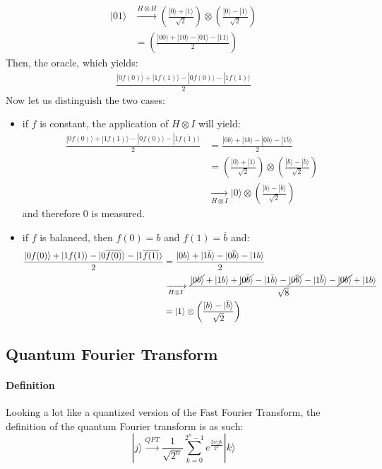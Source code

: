 \documentclass{article}
\begin{document}
\begin{align*}
    |01\rangle &\xrightarrow{H\otimes H} \left(\frac{|0\rangle+|1\rangle}{\sqrt{2}}\right)\otimes \left(\frac{|0\rangle-|1\rangle}{\sqrt{2}}\right)\\
    &= \left(\frac{|00\rangle+|10\rangle-|01\rangle-|11\rangle}{2}\right)
\end{align*}
Then, the oracle, which yields:
\begin{align*}
\frac{|0f(0)\rangle+|1f(1)\rangle-|0\overline{f(0)}\rangle-|1\overline{f(1)}\rangle}{2}
\end{align*}
Now let us distinguish the two cases:
\begin{itemize}
    \item if $f$ is constant, the application of $H\otimes I$ will yield:
\begin{align*}
\frac{|0f(0)\rangle+|1f(1)\rangle-|0\overline{f(0)}\rangle-|1\overline{f(1)}\rangle}{2}
&=\frac{|0b\rangle+|1b\rangle-|0\overline{b}\rangle-|1\overline{b}\rangle}{2}\\
&=\left(\frac{|0\rangle+|1\rangle}{\sqrt{2}}\right)\otimes \left(\frac{|b\rangle-|\overline{b}\rangle}{\sqrt{2}}\right)\\
&\xrightarrow[H\otimes I]{} |0\rangle \otimes \left(\frac{|b\rangle-|\overline{b}\rangle}{\sqrt{2}}\right)
\end{align*}
and therefore $0$ is measured.
\item if $f$ is balanced, then $f(0)=b$ and $f(1)=\overline{b}$ and:
\begin{align*}
\frac{|0f(0)\rangle+|1f(1)\rangle-|0\overline{f(0)}\rangle-|1\overline{f(1)}\rangle}{2}
&=\frac{|0b\rangle+|1\bar{b}\rangle-|0\overline{b}\rangle-|1b\rangle}{2}\\
&\xrightarrow[H\otimes I]{}
    \frac{\cancel{|0b\rangle}+|1b\rangle+\cancel{|0\bar{b}\rangle}-|1\bar{b}\rangle-\cancel{|0\overline{b}\rangle}-|1\overline{b}\rangle-\cancel{|0b\rangle}+|1b\rangle}{\sqrt{8}}\\
&= |1\rangle\otimes\left(\frac{|b\rangle-|\overline{b}\rangle}{\sqrt{2}}\right)
\end{align*}
\end{itemize}
\subsection{Quantum Fourier Transform}

\paragraph{Definition} Looking a lot like a quantized version of the Fast Fourier Transform, the definition of the quantum Fourier
transform is as such:
$$ |j\rangle \xrightarrow[]{QFT} \frac{1}{\sqrt{2^n}} \sum_{k=0}^{2^n-1} e^{\frac{2i\pi jk}{2^n}} |k\rangle $$
\end{document}
